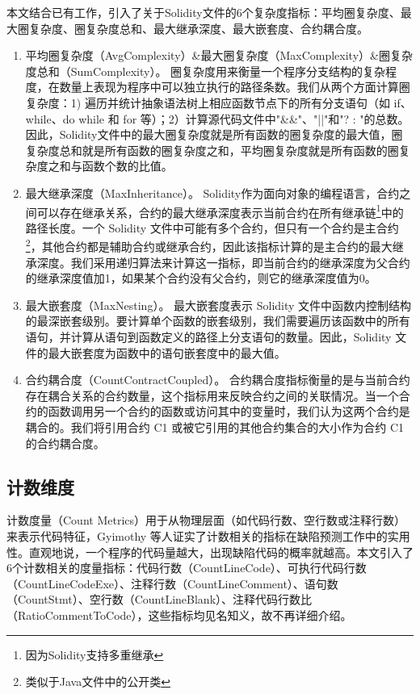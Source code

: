 本文结合已有工作，引入了关于Solidity文件的6个复杂度指标：平均圈复杂度、最大圈复杂度、圈复杂度总和、最大继承深度、最大嵌套度、合约耦合度。
\begin{enumerate}[label=(\arabic*)]
    \item 平均圈复杂度（AvgComplexity）\&最大圈复杂度（MaxComplexity）\&圈复杂度总和（SumComplexity）。
    圈复杂度用来衡量一个程序分支结构的复杂程度，在数量上表现为程序中可以独立执行的路径条数。我们从两个方面计算圈复杂度：1) 遍历并统计抽象语法树上相应函数节点下的所有分支语句（如 if、while、do while 和 for 等）；2）计算源代码文件中"\&\&"、"||"和"? : "的总数。因此，Solidity文件中的最大圈复杂度就是所有函数的圈复杂度的最大值，圈复杂度总和就是所有函数的圈复杂度之和，平均圈复杂度就是所有函数的圈复杂度之和与函数个数的比值。
    \item 最大继承深度（MaxInheritance）。
    Solidity作为面向对象的编程语言，合约之间可以存在继承关系，合约的最大继承深度表示当前合约在所有继承链\footnote{因为Solidity支持多重继承}中的路径长度。一个 Solidity 文件中可能有多个合约，但只有一个合约是主合约\footnote{类似于Java文件中的公开类}，其他合约都是辅助合约或继承合约，因此该指标计算的是主合约的最大继承深度。我们采用递归算法来计算这一指标，即当前合约的继承深度为父合约的继承深度值加1，如果某个合约没有父合约，则它的继承深度值为0。
    \item 最大嵌套度（MaxNesting）。
    最大嵌套度表示 Solidity 文件中函数内控制结构的最深嵌套级别。要计算单个函数的嵌套级别，我们需要遍历该函数中的所有语句，并计算从语句到函数定义的路径上分支语句的数量。因此，Solidity 文件的最大嵌套度为函数中的语句嵌套度中的最大值。
    \item 合约耦合度（CountContractCoupled）。
    合约耦合度指标衡量的是与当前合约存在耦合关系的合约数量，这个指标用来反映合约之间的关联情况。当一个合约的函数调用另一个合约的函数或访问其中的变量时，我们认为这两个合约是耦合的。我们将引用合约 C1 或被它引用的其他合约集合的大小作为合约 C1 的合约耦合度。
\end{enumerate}
\subsection{计数维度}
\label{sec:计数维度}
计数度量（Count Metrics）用于从物理层面（如代码行数、空行数或注释行数）来表示代码特征，Gyimothy 等人\cite{gyimothy2005}证实了计数相关的指标在缺陷预测工作中的实用性。直观地说，一个程序的代码量越大，出现缺陷代码的概率就越高。本文引入了6个计数相关的度量指标：代码行数（CountLineCode）、可执行代码行数（CountLineCodeExe）、注释行数（CountLineComment）、语句数（CountStmt）、空行数（CountLineBlank）、注释代码行数比（RatioCommentToCode），这些指标均见名知义，故不再详细介绍。

